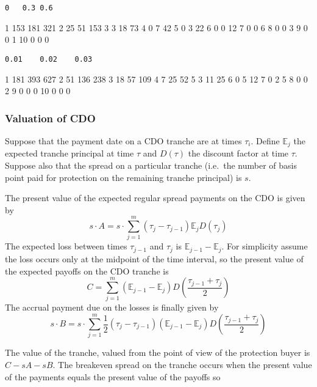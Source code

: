 \documentclass[11pt]{article}
\begin{document}
    \begin{verbatim}
0   0.3 0.6
\end{verbatim}

1 153 181 321 2 25 51 153 3 3 18 73 4 0 7 42 5 0 3 22 6 0 0 12 7 0 0 6 8
0 0 3 9 0 0 1 10 0 0 0

\begin{verbatim}
0.01    0.02    0.03
\end{verbatim}

1 181 393 627 2 51 136 238 3 18 57 109 4 7 25 52 5 3 11 25 6 0 5 12 7 0
2 5 8 0 0 2 9 0 0 0 10 0 0 0

    \hypertarget{valuation-of-cdo}{%
\subsubsection{Valuation of CDO}\label{valuation-of-cdo}}

Suppose that the payment date on a CDO tranche are at times \(\tau_i\).
Define \(\mathbb{E}_j\) the expected tranche principal at time \(\tau\)
and \(D(\tau)\) the discount factor at time \(\tau\). Suppose also that
the spread on a particular tranche (i.e.~the number of basis point paid
for protection on the remaining tranche principal) is \(s\).

The present value of the expected regular spread payments on the CDO is
given by \begin{equation}
s\cdot A = s\cdot \sum_{j=1}^{m}(\tau_j - \tau_{j-1})\mathbb{E}_{j}D(\tau_j)
\label{eq:A}
\end{equation} The expected loss between times \(\tau_{j-1}\) and
\(\tau_j\) is \(\mathbb{E}_{j-1}-\mathbb{E}_j\). For simplicity assume
the loss occurs only at the midpoint of the time interval, so the
present value of the expected payoffs on the CDO tranche is
\begin{equation}
C=\sum_{j=1}^{m}(\mathbb{E}_{j-1}-\mathbb{E}_j)D\left(\frac{\tau_{j-1}+\tau_j}{2}\right)
\label{eq:C}
\end{equation} The accrual payment due on the losses is finally given by
\begin{equation}
s\cdot B = s\cdot\sum_{j=1}^{m}\frac{1}{2}(\tau_j - \tau_{j-1})(\mathbb{E}_{j-1}-\mathbb{E}_j)D(\frac{\tau_{j-1}+\tau_j}{2})
\label{eq:B}
\end{equation}

The value of the tranche, valued from the point of view of the
protection buyer is \(C-sA-sB\). The breakeven spread on the tranche
occurs when the present value of the payments equals the present value
of the payoffs so
\end{document}
